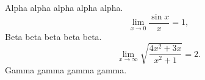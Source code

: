 \documentclass[12pt]{article}
\begin{document}
Alpha alpha alpha alpha alpha.
\[
  \lim_{x \to 0} \frac{\sin x}{x} = 1,
\]
Beta beta beta beta beta.
\[
  \lim_{x \to \infty} \sqrt{\frac{4x^2 + 3x}{x^2 + 1}} = 2.
\]
Gamma gamma gamma gamma.
\end{document}
